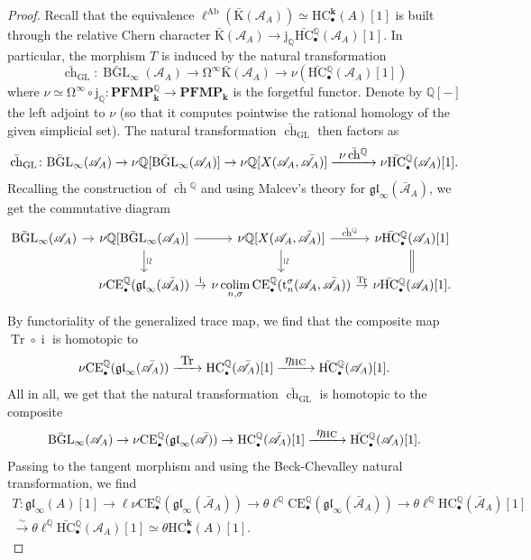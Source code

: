 \documentclass[JEP,XML,SOM,Unicode,NoEqCountersInSection]{cedram}
\let\mathcal\mathscr
\newcommand{\To}[1]{\mathchoice{\xrightarrow{\textstyle\kern4pt#1\kern3pt}}{\stackrel{#1}{\longrightarrow}}{}{}}
\newcommand{\isom}{\stackrel{\sim}{\longrightarrow}}
\let\widebar\bar
\newcommand{\sbullet}{{\scriptscriptstyle\bullet}}
\theoremstyle{definition}
\newcommand{\Q}{\mathbb{Q}}
\DeclareMathOperator{\colim}{colim}
\DeclareMathOperator{\BGL}{BGL}
\newcommand{\gl}{\mathfrak{gl}}
\newcommand{\bch}{\widebar{\operatorname{ch}}}
\newcommand{\GL}{\operatorname{GL}}
\newcommand{\bK}{\widebar{\mathrm{K}}}
\newcommand{\bBGL}{\widebar{\BGL}}
\newcommand{\HC}{\mathrm{HC}}
\newcommand{\bHC}{\widebar{\mathrm{HC}}{}}
\newcommand{\infloop}{\operatorname{\Omega^\infty}}
\renewcommand{\k}{{\boldsymbol{k}}}
\newcommand{\jQ}{\operatorname{j_\Q}}
\newcommand{\ellAb}{\operatorname{\ell^{Ab}}}
\newcommand{\ellQ}{\operatorname{\ell^\Q}}
\newcommand{\Ac}{\mathcal{A}}
\newcommand{\bAc}{\widebar{\mathcal{A}}}
\newcommand{\CE}{\mathrm{CE}}
\newcommand{\PFMP}{\mathbf{PFMP}}
\newcommand{\Tr}{\operatorname{Tr}}
\begin{document}
\begin{proof}
Recall that the equivalence $\ellAb(\bK(\Ac_A)) \simeq \HC^\k_\sbullet(A)[1]$ is built through the relative Chern character $\bK(\Ac_A) \to \jQ \bHC^\Q_\sbullet(\Ac_A)[1]$. In particular, the morphism $T$ is induced by the natural transformation
\[
\bch_{\GL} \colon \bBGL_\infty(\Ac_A) \to \infloop \bK(\Ac_A) \to \nu(\bHC^\Q_\sbullet(\Ac_A)[1])
\]
where $\nu \simeq \infloop \circ \jQ \colon \PFMP_\k^\Q \to \PFMP_\k$ is the forgetful functor. Denote by $\Q[-]$ the left adjoint to $\nu$ (so that it computes pointwise the rational homology of the given simplicial set).
The natural transformation $\bch_{\GL}$ then factors as
\[
\bch_{\GL} \colon \bBGL_\infty(\Ac_A) \to \nu \Q[\bBGL_\infty(\Ac_A)] \to \nu \Q[X(\Ac_A, \bAc_A)] \To{\operatorname{\nu}\bch{}^\Q} \nu \bHC^\Q_\sbullet(\Ac_A)[1].
\]
Recalling the construction of $\bch{}^\Q$ and using Malcev's theory for $\gl_\infty(\bAc_A)$, we get the commutative diagram
\[\hspace*{-1.5mm}
\begin{tikzcd}[column sep=.88em]
\bBGL_\infty(\Ac_A) \ar{r} & \nu\Q[\bBGL_\infty(\Ac_A)] \ar{r} \ar{d}[sloped,above]{\simeq} & \nu\Q[X(\Ac_A,\bAc_A)] \ar{r}{\bch{}^\Q} \ar{d}[sloped,above]{\simeq} & \nu \bHC^\Q_\sbullet(\Ac_A)[1] \ar[equal, no head]{d} \\
& \nu \CE_\sbullet^\Q(\gl_\infty(\bAc_A)) \ar{r}{\mathrm{i}} & \displaystyle \nu \colim_{n, \sigma} \CE_\sbullet^\Q(\mathrm{t}^\sigma_n(\Ac_A,\bAc_A)) \ar{r}{\Tr} & \nu \bHC_\sbullet^\Q(\Ac_A)[1].
\end{tikzcd}
\]
By functoriality of the generalized trace map, we find that the composite map $\Tr \circ \operatorname{i}$ is homotopic to
\[
\nu \CE_\sbullet^\Q(\gl_\infty(\bAc_A)) \To{\Tr} \HC_\sbullet^\Q(\bAc_A)[1] \To{\eta_\HC} \bHC_\sbullet^\Q(\Ac_A)[1].
\]
All in all, we get that the natural transformation $\bch_{\GL}$ is homotopic to the composite
\[
\bBGL_\infty(\Ac_A) \to \nu \CE_\sbullet^\Q(\gl_\infty(\bAc)) \to \HC_\sbullet^\Q(\bAc_A)[1] \To{\eta_\HC} \bHC_\sbullet^\Q(\Ac_A)[1].
\]
Passing to the tangent morphism and using the Beck-Chevalley natural transformation, we find
\begin{multline*}
T \colon \gl_\infty(A)[1] \to \ell \nu \CE_\sbullet^\Q(\gl_\infty(\bAc_A)) \to \theta \ellQ \CE_\sbullet^\Q(\gl_\infty(\bAc_A)) \to \theta \ellQ \HC_\sbullet^\Q(\bAc_A)[1]\\ \isom \theta \ellQ \bHC_\sbullet^\Q(\Ac_A)[1] \simeq \theta \HC_\sbullet^\k(A)[1].
\end{multline*}


\end{proof}
\end{document}
